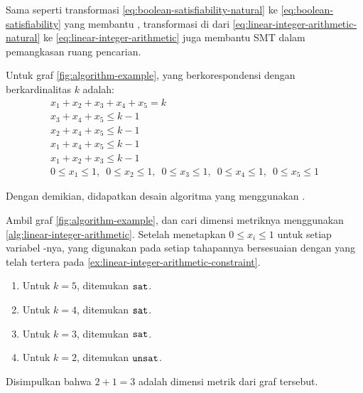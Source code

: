 Sama seperti transformasi \autoref{eq:boolean-satisfiability-natural} ke \autoref{eq:boolean-satisfiability} yang membantu , transformasi di  dari \autoref{eq:linear-integer-arithmetic-natural} ke \autoref{eq:linear-integer-arithmetic} juga membantu SMT dalam pemangkasan ruang pencarian.

\begin{example}
	Untuk graf \autoref{fig:algorithm-example},  yang berkorespondensi dengan  berkardinalitas \(k\) adalah:
	\[
		\begin{array}{c}
			x_1 + x_2 + x_3 + x_4 + x_5 = k \\ [4pt]
			x_3 + x_4 + x_5 \leq k - 1 \\
			x_2 + x_4 + x_5 \leq k - 1 \\
			x_1 + x_4 + x_5 \leq k - 1 \\
			x_1 + x_2 + x_3 \leq k - 1 \\ [4pt]
			0 \leq x_1 \leq 1,\enspace
			0 \leq x_2 \leq 1,\enspace
			0 \leq x_3 \leq 1,\enspace
			0 \leq x_4 \leq 1,\enspace
			0 \leq x_5 \leq 1
		\end{array}
	\]
	\label{ex:linear-integer-arithmetic-constraint}
\end{example}

\noindent Dengan demikian, didapatkan desain algoritma yang menggunakan .

\begin{example}
	Ambil graf \autoref{fig:algorithm-example}, dan cari dimensi metriknya menggunakan \autoref{alg:linear-integer-arithmetic}. Setelah menetapkan  \(0 \leq x_i \leq 1\) untuk setiap variabel -nya,  yang digunakan pada setiap tahapannya bersesuaian dengan yang telah tertera pada \autoref{ex:linear-integer-arithmetic-constraint}.
	\begin{enumerate}
		\item Untuk \(k = 5\), ditemukan \(\mathtt{sat}\).
		\item Untuk \(k = 4\), ditemukan \(\mathtt{sat}\).
		\item Untuk \(k = 3\), ditemukan \(\mathtt{sat}\).
		\item Untuk \(k = 2\), ditemukan \(\mathtt{unsat}\).
	\end{enumerate}
	Disimpulkan bahwa \(2 + 1 = 3\) adalah dimensi metrik dari graf tersebut.
\end{example}


